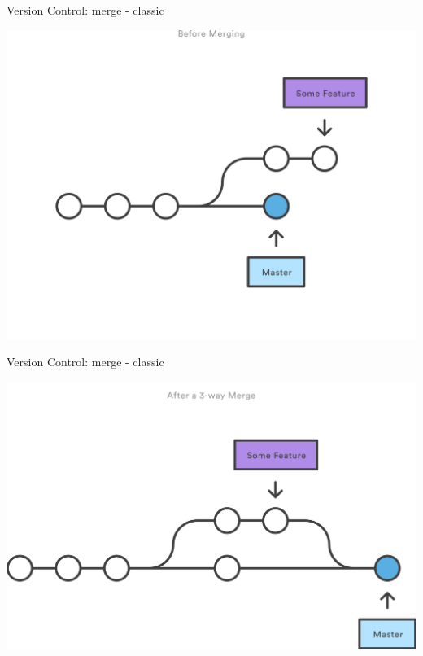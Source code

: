 \begin{frame}[fragile]{Version Control: merge - classic}

\begin{center}
\includegraphics[width=\textwidth]{git-merge-nff}
\end{center}

\end{frame}

\begin{frame}[fragile]{Version Control: merge - classic}

\begin{center}
\includegraphics[width=\textwidth]{git-merge-nff2}
\end{center}

\end{frame}


